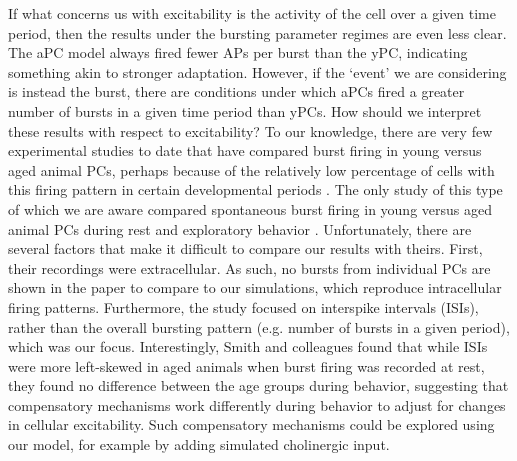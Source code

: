 \documentclass[12pt]{article}
\begin{document}
 If what concerns us with excitability is the activity of the cell over a given time period, then the results under the bursting parameter regimes are even less clear. The aPC model always fired fewer APs per burst than the yPC, indicating something akin to stronger adaptation. However, if the `event' we are considering is instead the burst, there are conditions under which aPCs fired a greater number of bursts in a given time period than yPCs. How should we interpret these results with respect to excitability? To our knowledge, there are very few experimental studies to date that have compared burst firing in young versus aged animal PCs, perhaps because of the relatively low percentage of cells with this firing pattern in certain developmental periods \cite{chen2005transitional}. The only study of this type of which we are aware compared spontaneous burst firing in young versus aged animal PCs during rest and exploratory behavior \cite{smith2000effect}. Unfortunately, there are several factors that make it difficult to compare our results with theirs. First, their recordings were extracellular. As such, no bursts from individual PCs are shown in the paper to compare to our simulations, which reproduce intracellular firing patterns. Furthermore, the study focused on interspike intervals (ISIs), rather than the overall bursting pattern (e.g. number of bursts in a given period), which was our focus. Interestingly, Smith and colleagues \cite{smith2000effect} found that while ISIs were more left-skewed in aged animals when burst firing was recorded at rest, they found no difference between the age groups during behavior, suggesting that compensatory mechanisms work differently during behavior to adjust for changes in cellular excitability. Such compensatory mechanisms could be explored using our model, for example by adding simulated cholinergic input.     
\end{document}
